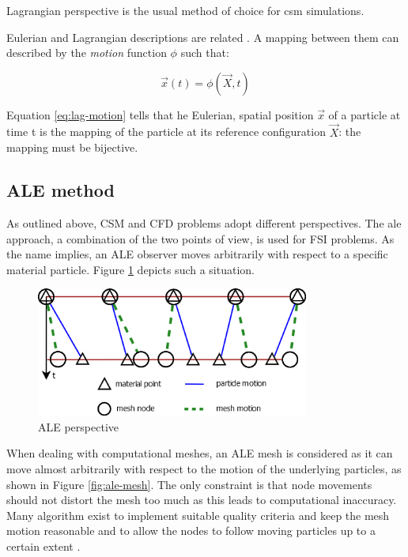 Lagrangian perspective is the usual method of choice for \acrfull{csm} simulations.

Eulerian and Lagrangian descriptions are related \cite{bertram2012elasticity}. A mapping between them can described by the \textit{motion} function $\phi$ such that:


\begin{equation}
\vec{x}(t) = \phi(\vec{X}, t)
\label{eq:lag-motion}
\end{equation}

Equation \ref{eq:lag-motion} tells that he Eulerian, spatial position $\vec{x}$ of a particle at time t is the
mapping of the particle at its reference configuration $\vec{X}$: the mapping must be bijective.

\subsection{ALE method}
\label{subsec:ALE}

As outlined above, CSM and CFD problems adopt different perspectives. The \acrfull{ale} approach, a combination of the two points of view, is used for FSI problems. As the name implies, an ALE observer moves arbitrarily with respect to a specific material particle.
Figure \ref{fig:ale} depicts such a situation.

\begin{figure}[htbp!]
	\centering
	\includegraphics[width=0.8\textwidth]{images/ale}
	\caption{ALE perspective}
	\label{fig:ale}
\end{figure}

When dealing with computational meshes, an ALE mesh is considered as it can move almost arbitrarily with respect to the motion of the underlying particles, as shown in Figure \ref{fig:ale-mesh}.
The only constraint is that node movements should not distort the mesh too much as this leads to computational inaccuracy. Many algorithm exist to implement suitable quality criteria and keep the mesh motion reasonable and to allow the nodes to follow moving particles up to a certain extent \cite{de2007mesh}.


